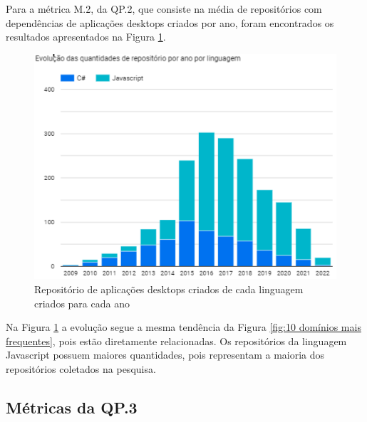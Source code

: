 \documentclass[12pt]{article}
\begin{document}
Para a métrica M.2, da QP.2, que consiste na média de repositórios com dependências de aplicações desktops criados por ano, foram encontrados os resultados apresentados na Figura \ref{fig:Repositório de aplicações desktop criados de cada linguagem criados por ano}.
\begin{figure}[H]
    \centering
    \includegraphics[]{images/lang por ano.png}
    \caption{Repositório de aplicações desktops criados de cada linguagem criados para cada ano}
    \label{fig:Repositório de aplicações desktop criados de cada linguagem criados por ano}
\end{figure}
Na Figura \ref{fig:Repositório de aplicações desktop criados de cada linguagem criados por ano} a evolução segue a mesma tendência da Figura \ref{fig:10 domínios mais frequentes}, pois estão diretamente relacionadas. Os repositórios da linguagem Javascript possuem maiores quantidades, pois representam a maioria dos repositórios coletados na pesquisa.

\subsection{Métricas da QP.3}
\end{document}
